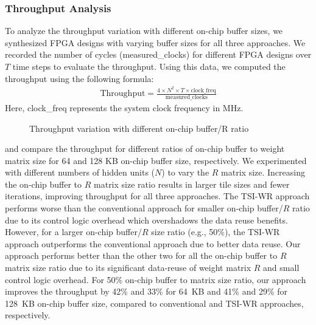 {{{{\subsubsection{Throughput Analysis}
To analyze the throughput variation with different on-chip buffer sizes, we synthesized FPGA designs with varying buffer sizes for all three approaches. We recorded the number of cycles (measured\_clocks) for different FPGA designs over $T$ time steps to evaluate the throughput. Using this data, we computed the throughput using the following formula:
\begin{align}\label{eq:througput}
	\text{Throughput}=\frac{4{\times}N^2{\times}T{\times}{\text {clock\_freq}}}{\text{measured\_clocks}}
\end{align}
Here, clock\_freq represents the system clock frequency in MHz.
\begin{figure}[htb!]
	\centering
	\hspace{2.0em}
	\caption{Throughput variation with different on-chip buffer/R ratio}	\label{fig:throughputVsMem}
\end{figure}
 and  compare the throughput for different ratios of on-chip buffer to weight matrix size for 64 and 128 KB on-chip buffer size, respectively. We experimented with different numbers of hidden units ($N$) to vary the $R$ matrix size. Increasing the on-chip buffer to $R$ matrix size ratio results in larger tile sizes and fewer iterations, improving throughput for all three approaches. The TSI-WR approach performs worse than the conventional approach for smaller on-chip buffer/$R$ ratio due to its control logic overhead which overshadows the data reuse benefits. However, for a larger on-chip buffer/$R$ size ratio (e.g., 50\%), the TSI-WR approach outperforms the conventional approach due to better data reuse. Our approach performs better than the other two for all the on-chip buffer to $R$ matrix size ratio due to its significant data-reuse of weight matrix $R$ and small control logic overhead.
For 50\% on-chip buffer to matrix size ratio, our approach improves the throughput by 42\% and 33\% for 64~KB and 41\% and 29\% for 128~KB on-chip buffer size, compared to conventional and TSI-WR approaches, respectively.
}}}}
